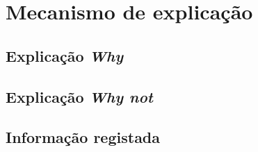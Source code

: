 \chapter{Mecanismo de explicação}
\label{cap:explicacao}

\section{Explicação \emph{Why}}


\section{Explicação \emph{Why not}}


\section{Informação registada}


